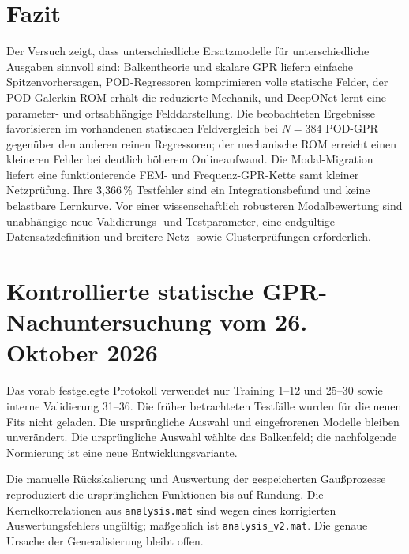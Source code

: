 \documentclass[11pt,a4paper]{article}
\begin{document}
\section{Fazit}
Der Versuch zeigt, dass unterschiedliche Ersatzmodelle für unterschiedliche Ausgaben sinnvoll sind: Balkentheorie und skalare GPR liefern einfache Spitzenvorhersagen, POD-Regressoren komprimieren volle statische Felder, der POD-Galerkin-ROM erhält die reduzierte Mechanik, und DeepONet lernt eine parameter- und ortsabhängige Felddarstellung. Die beobachteten Ergebnisse favorisieren im vorhandenen statischen Feldvergleich bei $N=384$ POD-GPR gegenüber den anderen reinen Regressoren; der mechanische ROM erreicht einen kleineren Fehler bei deutlich höherem Onlineaufwand. Die Modal-Migration liefert eine funktionierende FEM- und Frequenz-GPR-Kette samt kleiner Netzprüfung. Ihre 3,366\,\% Testfehler sind ein Integrationsbefund und keine belastbare Lernkurve. Vor einer wissenschaftlich robusteren Modalbewertung sind unabhängige neue Validierungs- und Testparameter, eine endgültige Datensatzdefinition und breitere Netz- sowie Clusterprüfungen erforderlich.


\section{Kontrollierte statische GPR-Nachuntersuchung vom 26. Oktober 2026}
Das vorab festgelegte Protokoll verwendet nur Training 1--12 und 25--30 sowie interne Validierung 31--36. Die früher betrachteten Testfälle wurden für die neuen Fits nicht geladen. Die ursprüngliche Auswahl und eingefrorenen Modelle bleiben unverändert. Die ursprüngliche Auswahl wählte das Balkenfeld; die nachfolgende Normierung ist eine neue Entwicklungsvariante.

Die manuelle Rückskalierung und Auswertung der gespeicherten Gaußprozesse reproduziert die ursprünglichen Funktionen bis auf Rundung. Die Kernelkorrelationen aus \texttt{analysis.mat} sind wegen eines korrigierten Auswertungsfehlers ungültig; maßgeblich ist \texttt{analysis\_v2.mat}. Die genaue Ursache der Generalisierung bleibt offen.
\end{document}
